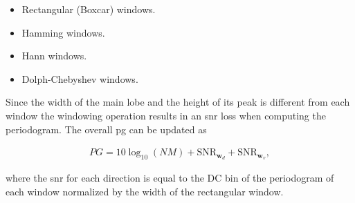 	 \begin{itemize}
	 	\item Rectangular (Boxcar) windows.
	 	\item Hamming windows.
	 	\item Hann windows.
	 	\item Dolph-Chebyshev windows.
	 \end{itemize}
	
	
	Since the width of the main lobe and the height of its peak is different from each window the windowing operation results in an \gls{snr} loss when computing the periodogram.
	The overall \gls{pg} can be updated as
	
	\begin{align}
		PG = 10\log_{10}(NM) + \text{SNR}_{\bm{w}_d} + \text{SNR}_{\bm{w}_v},
	\end{align}
	
	where the \gls{snr} for each direction is equal to the DC bin of the periodogram of each window normalized by the width of the rectangular window.
	
